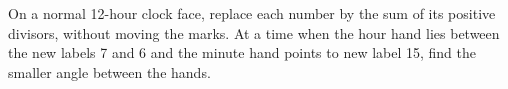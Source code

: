 On a normal 12-hour clock face, replace each number by the sum of its positive divisors, without moving the marks. At a time when the hour hand lies between the new labels 7 and 6 and the minute hand points to new label 15, find the smaller angle between the hands.
